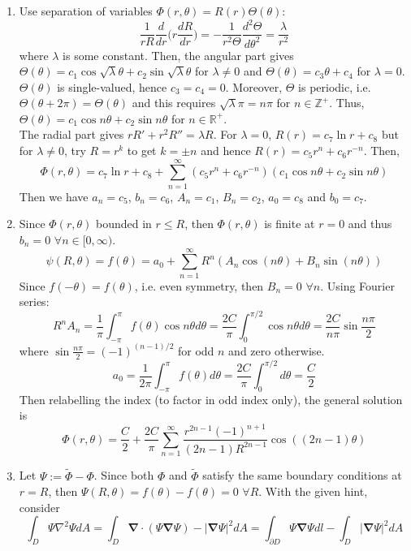 \documentclass[a4paper]{article}
\begin{document}
\newpage
\begin{ans}\leavevmode
\begin{enumerate}[label=(\roman*)]
\item Use separation of variables $\Phi(r,\theta)=R(r)\Theta(\theta)$:
$$\frac{1}{rR}\frac{d}{dr}\bigg(r\frac{dR}{dr}\bigg)=-\frac{1}{r^2\Theta}\frac{d^2\Theta}{d\theta^2}=\frac{\lambda}{r^2}$$
where $\lambda$ is some constant. Then, the angular part gives $\Theta(\theta)=c_1\cos\sqrt{\lambda}\theta+c_2\sin\sqrt{\lambda}\theta$ for $\lambda\neq 0$ and $\Theta(\theta)=c_3\theta+c_4$ for $\lambda=0$. $\Theta(\theta)$ is single-valued, hence $c_3=c_4=0$. Moreover, $\Theta$ is periodic, i.e. $\Theta(\theta+2\pi)=\Theta(\theta)$ and this requires $\sqrt{\lambda}\pi=n\pi$ for $n\in\mathbb{Z}^+$. Thus, $\Theta(\theta)=c_1\cos n\theta+c_2\sin n\theta$ for $n\in\mathbb{R}^+$.\\[5pt]
The radial part gives $rR'+r^2R''=\lambda R$. For $\lambda=0$, $R(r)=c_7\ln r+c_8$ but for $\lambda\neq 0$, try $R=r^k$ to get $k=\pm n$ and hence $R(r)=c_5r^n+c_6r^{-n}$. Then,
$$\Phi(r,\theta)=c_7\ln r+c_8+\sum_{n=1}^\infty(c_5r^n+c_6r^{-n})(c_1\cos n\theta+c_2\sin n\theta)$$
Then we have $a_n=c_5$, $b_n=c_6$, $A_n=c_1$, $B_n=c_2$,  $a_0=c_8$ and $b_0=c_7$.
\item Since $\Phi(r,\theta)$ bounded in $r\leq R$, then $\Phi(r,\theta)$ is finite at $r=0$ and thus $b_n=0$ $\forall n\in[0,\infty)$.
$$\psi(R,\theta)=f(\theta)=a_0+\sum_{n=1}^\infty R^n(A_n\cos(n\theta)+B_n\sin(n\theta))$$
Since $f(-\theta)=f(\theta)$, i.e. even symmetry, then $B_n=0$ $\forall n$. Using Fourier series:
$$R^nA_n=\frac{1}{\pi}\int_{-\pi}^\pi f(\theta)\cos n\theta d\theta=\frac{2C}{\pi}\int_0^{\pi/2}\cos n\theta d\theta=\frac{2C}{n\pi}\sin\frac{n\pi}{2}$$
where $\sin\frac{n\pi}{2}=(-1)^{(n-1)/2}$ for odd $n$ and zero otherwise.
$$a_0=\frac{1}{2\pi}\int_{-\pi}^\pi f(\theta) d\theta=\frac{2C}{\pi}\int_0^{\pi/2}d\theta=\frac{C}{2}$$
Then relabelling the index (to factor in odd index only), the general solution is
$$\Phi(r,\theta)=\frac{C}{2}+\frac{2C}{\pi}\sum_{n=1}^\infty\frac{r^{2n-1}(-1)^{n+1}}{(2n-1)R^{2n-1}}\cos((2n-1)\theta)$$
\item Let $\Psi:=\tilde{\Phi}-\Phi$. Since both $\Phi$ and $\tilde{\Phi}$ satisfy the same boundary conditions at $r=R$, then $\Psi(R,\theta)=f(\theta)-f(\theta)=0$ $\forall R$. With the given hint, consider
$$\int_D\Psi\nabla^2\Psi dA=\int_D\boldsymbol{\nabla}\cdot(\Psi\boldsymbol{\nabla}\Psi)-|\boldsymbol{\nabla}\Psi|^2dA=\int_{\partial D}\Psi\boldsymbol{\nabla}\Psi dl-\int_D|\boldsymbol{\nabla}\Psi|^2dA$$

\end{enumerate}
\end{ans}
\end{document}
